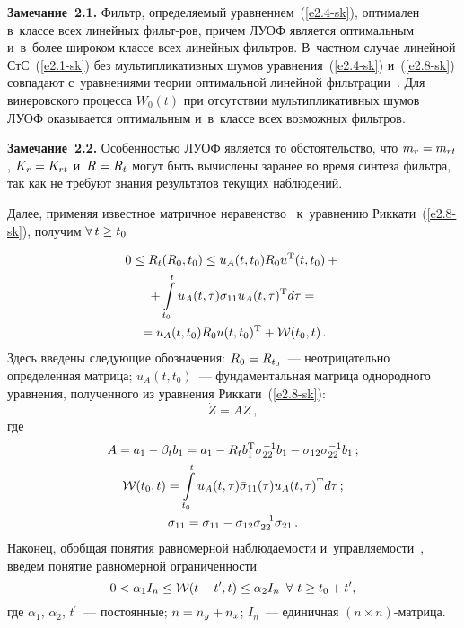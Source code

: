 \begin{multicols}{2}
\smallskip

\noindent
\textbf{Замечание~2.1.}
Фильтр, определяемый уравнением~(\ref{e2.4-sk}), оптимален
в~классе всех линейных фильт-\linebreak ров, причем ЛУОФ
является оптимальным и~в~более широком классе всех линейных
фильт\-ров.
 В~частном случае линейной СтС~(\ref{e2.1-sk})
 без мультипликативных шумов уравнения~(\ref{e2.4-sk})
 и~(\ref{e2.8-sk}) совпадают с~уравнениями теории оптимальной линейной
\mbox{фильтрации}~\cite{1-sk, 3-sk}. Для винеровского процесса  $W_0(t)$ при
отсутствии мультипликативных шумов ЛУОФ оказывается оптимальным
и~в~классе всех возможных фильтров.

\smallskip

\noindent
\textbf{Замечание~2.2.}
Особенностью ЛУОФ является то обстоятельство, что
$m_r\hm=m_{rt}$, $K_r\hm=K_{rt}$ и~$R\hm=R_t$ могут быть вычислены заранее
во время синтеза фильтра, так как не требуют знания результатов
текущих наблюдений.

Далее, применяя известное матричное неравенство~\cite{6-sk, 7-sk}
к~уравнению Риккати~(\ref{e2.8-sk}), получим  $\forall\, t\hm\ge t_0$

\noindent
\begin{multline*}
0\le R_t (R_0, t_0) \le u_A(t, t_0) R_0 u^{\mathrm{T}} (t, t_0) +{}\\
{}+
\iii_{t_0}^t u_A(t,\tau)  \bar \si_{11} u_A(t,\tau)^{\mathrm{T}} d\tau={}\\
{}=u_A(t, t_0) R_0 u (t, t_0)^{\mathrm{T}} + \mathcal{W}(t_0, t)\,. %
\end{multline*}
Здесь введены следующие обозначения: $R_0\hm=R_{t_0}$~--- неотрицательно
определенная  матрица;
$u_A(t, t_0)$~--- фундаментальная матрица однородного уравнения,
полученного из уравнения Риккати~(\ref{e2.8-sk}):
\begin{equation}
\dot Z =A Z\,,
\label{e2.14-sk}
\end{equation}
где
\begin{gather}
 A = a_1 -\beta_t b_1 = a_1 - R_t b_1^{\mathrm{T}} \sigma_{22}^{-1}
b_1 - \sigma_{12} \sigma_{22}^{-1} b_1\,;\notag\\
\mathcal{W} (t_0, t) =\int\limits_{t_0}^t u_A (t, \tau) \bar \sigma_{11} (\tau)
u_A (t,\tau)^{\mathrm{T}} d\tau\,;\label{e2.15-sk}\\
\bar \sigma_{11} =\sigma_{11}-\sigma_{12} \sigma_{22}^{-1} \sigma_{21}\,.\label{e2.16-sk}
\end{gather}
Наконец, обобщая понятия равномерной наблюдаемости и~управляемости~\cite{6-sk, 7-sk},
введем понятие равномерной ограниченности
\begin{equation}
0<\alpha_1 I_n \le \mathcal{W}(t-t^\prime, t)\le \alpha_2 I_n \enskip
\forall\ t \ge t_0+t^\prime,\label{e2.17-sk}
\end{equation}
где $\alpha_1$, $\alpha_2$, $t^\prime$~--- постоянные; $n\hm=n_y\hm+n_x$; $I_n$~---
единичная  $(n\times n)$-мат\-рица.


\end{multicols}
